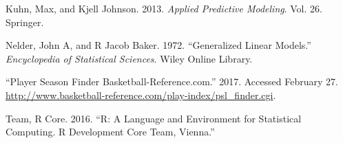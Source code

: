\documentclass[]{elsarticle} %
\begin{document}
Kuhn, Max, and Kjell Johnson. 2013. \emph{Applied Predictive Modeling}.
Vol. 26. Springer.

Nelder, John A, and R Jacob Baker. 1972. ``Generalized Linear Models.''
\emph{Encyclopedia of Statistical Sciences}. Wiley Online Library.

``Player Season Finder Basketball-Reference.com.'' 2017. Accessed
February 27.
\url{http://www.basketball-reference.com/play-index/psl_finder.cgi}.

Team, R Core. 2016. ``R: A Language and Environment for Statistical
Computing. R Development Core Team, Vienna.''
\end{document}
